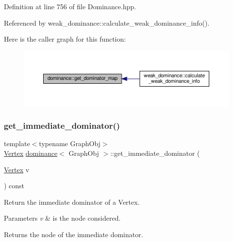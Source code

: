 Definition at line 756 of file Dominance.\+hpp.



Referenced by weak\+\_\+dominance\+::calculate\+\_\+weak\+\_\+dominance\+\_\+info().

Here is the caller graph for this function\+:
\nopagebreak
\begin{figure}[H]
\begin{center}
\leavevmode
\includegraphics[width=350pt]{d1/d93/classdominance_a60e3d1d880582bd53ae784da18a9a3ff_icgraph}
\end{center}
\end{figure}
\mbox{\label{classdominance_abe0394af57bb3d7bf5ce14330c1c7085}} 
\subsubsection{\texorpdfstring{get\+\_\+immediate\+\_\+dominator()}{get\_immediate\_dominator()}}
{\footnotesize\ttfamily template$<$typename Graph\+Obj$>$ \\
\hyperlink{classdominance_acc73faf26e73171b15fd0ff6c63ca393}{Vertex} \hyperlink{classdominance}{dominance}$<$ Graph\+Obj $>$\+::get\+\_\+immediate\+\_\+dominator (\begin{DoxyParamCaption}\item[{\hyperlink{classdominance_acc73faf26e73171b15fd0ff6c63ca393}{Vertex}}]{v }\end{DoxyParamCaption}) const\hspace{0.3cm}{\ttfamily [inline]}}



Return the immediate dominator of a Vertex. 


\begin{DoxyParams}{Parameters}
{\em v} & is the node considered. \\
\hline
\end{DoxyParams}
\begin{DoxyReturn}{Returns}
the node of the immediate dominator. 
\end{DoxyReturn}


